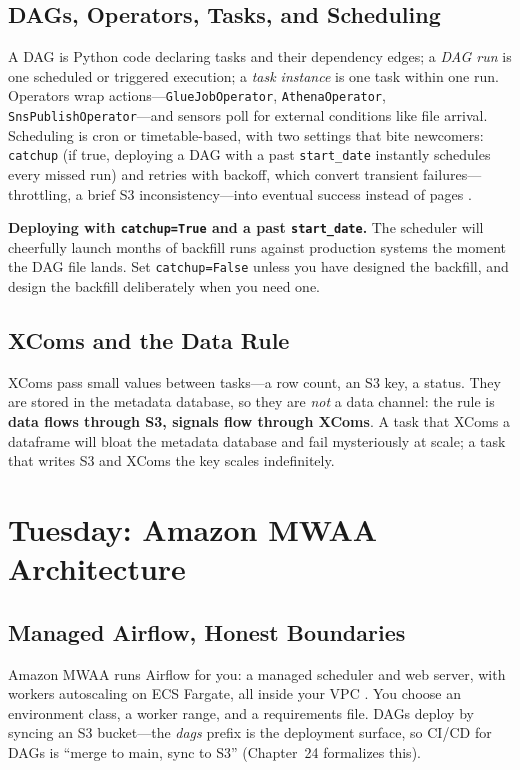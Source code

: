 \subsection{DAGs, Operators, Tasks, and Scheduling}
A DAG is Python code declaring tasks and their dependency edges; a \emph{DAG run} is one scheduled or triggered execution; a \emph{task instance} is one task within one run. Operators wrap actions---\texttt{GlueJobOperator}, \texttt{AthenaOperator}, \texttt{SnsPublishOperator}---and sensors poll for external conditions like file arrival. Scheduling is cron or timetable-based, with two settings that bite newcomers: \texttt{catchup} (if true, deploying a DAG with a past \texttt{start\_date} instantly schedules every missed run) and retries with backoff, which convert transient failures---throttling, a brief S3 inconsistency---into eventual success instead of pages \cite{apacheAirflow}.

\begin{pitfall}
\textbf{Deploying with \texttt{catchup=True} and a past \texttt{start\_date}.} The scheduler will cheerfully launch months of backfill runs against production systems the moment the DAG file lands. Set \texttt{catchup=False} unless you have designed the backfill, and design the backfill deliberately when you need one.
\end{pitfall}

\subsection{XComs and the Data Rule}
XComs pass small values between tasks---a row count, an S3 key, a status. They are stored in the metadata database, so they are \emph{not} a data channel: the rule is \textbf{data flows through S3, signals flow through XComs}. A task that XComs a dataframe will bloat the metadata database and fail mysteriously at scale; a task that writes S3 and XComs the key scales indefinitely.

\section{Tuesday: Amazon MWAA Architecture}
\subsection{Managed Airflow, Honest Boundaries}
Amazon MWAA runs Airflow for you: a managed scheduler and web server, with workers autoscaling on ECS Fargate, all inside your VPC \cite{awsMWAADocs}. You choose an environment class, a worker range, and a requirements file. DAGs deploy by syncing an S3 bucket---the \emph{dags} prefix is the deployment surface, so CI/CD for DAGs is ``merge to main, sync to S3'' (Chapter~24 formalizes this).

